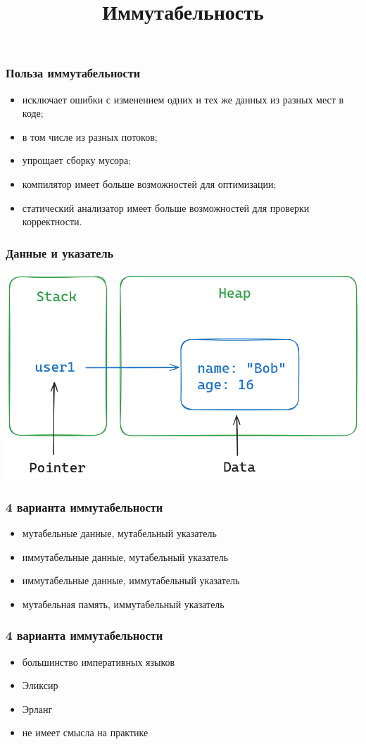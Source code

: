 \documentclass[10pt]{beamer}
\title{Иммутабельность}
\begin{document}
\begin{frame}
  \frametitle{Польза иммутабельности}
  \begin{itemize}
  \item исключает ошибки с изменением одних и тех же данных из разных мест в коде;
  \item в том числе из разных потоков;
  \item упрощает сборку мусора;
  \item компилятор имеет больше возможностей для оптимизации;
  \item статический анализатор имеет больше возможностей для проверки корректности.
  \end{itemize}
\end{frame}

\begin{frame}
  \frametitle{Данные и указатель}
  \includegraphics[scale=0.33]{data_and_pointer}
\end{frame}

\begin{frame}
  \frametitle{4 варианта иммутабельности}
  \begin{itemize}
  \item мутабельные данные, мутабельный указатель
  \item иммутабельные данные, мутабельный указатель
  \item иммутабельные данные, иммутабельный указатель
  \item мутабельная память, иммутабельный указатель
  \end{itemize}
\end{frame}

\begin{frame}
  \frametitle{4 варианта иммутабельности}
  \begin{itemize}
  \item большинство императивных языков
  \item Эликсир
  \item Эрланг
  \item не имеет смысла на практике
  \end{itemize}
\end{frame}
\end{document}
